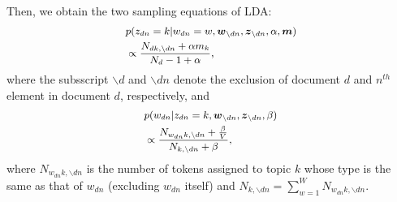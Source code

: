 \documentclass[twoside]{article}
\begin{document}
  	  Then, we obtain 
  	  \fi
  	  the two sampling equations of LDA:
  	  \begin{equation*}
  	    	 \footnotesize
  	  \begin{aligned}
  	  &p(z_{dn}=k | w_{dn}=w,\boldsymbol{w}_{\backslash dn}, \boldsymbol{z}_{\backslash dn},\alpha, \boldsymbol{m})\\&\propto
  	  \frac{N_{dk, \backslash dn}+\alpha m_k}{N_d-1+\alpha},
  	   \end{aligned}
  	   \end{equation*}
  	   where the subsscript $\backslash d$ and $\backslash dn$ denote the exclusion of document $d$ and $n^{th}$ element in document $d$, respectively, and
  	   \begin{equation*}
  	     	 \footnotesize
  	   \begin{aligned}  
  	   	  &p(w_{dn}| z_{dn}=k,\boldsymbol{w}_{\backslash dn}, \boldsymbol{z}_{\backslash dn},\beta)\\&\propto
  	   	  \frac{N_{w_{dn}k, \backslash dn}+\frac{\beta}{V}}{N_{k, \backslash dn}+\beta},
  	  \end{aligned}
  	  \end{equation*}
  	  where $N_{w_{dn}k, \backslash dn}$ is the number of tokens assigned to topic $k$ whose type is the same as that of $w_{dn}$ (excluding $w_{dn}$ itself) and $N_{k, \backslash dn}=\sum_{w=1}^W N_{w_{dn}k, \backslash dn}$. 
  	  
\end{document}
